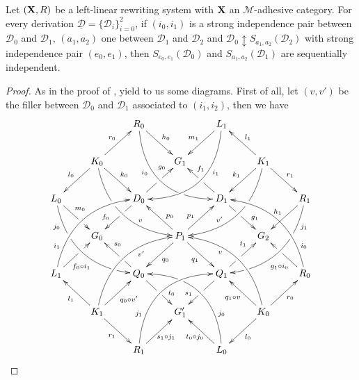 \documentclass[a4paper,UKenglish,cleveref,pdftex,thm-restate,numberwithinsect]{lipics-v2021}
\def\R{\mathsf{R}}
\def\X{\textbf {\textup{X}}}
\newcommand{\dder}[1]{\mathscr{#1}}
\newcommand{\der}[1]{\underline{\dder{#1}}}
\begin{document}

	\begin{lemma}\label{lem:iig2}Let $(\X,\R)$ be a left-linear rewriting system with $\X$ an $\mathcal{M}$-adhesive category. For every derivation $\der{D}=\{\dder{D}_i\}_{i=0}^2$, if $(i_0,i_1)$ is a strong independence pair between $\dder{D}_0$ and $\dder{D}_1$, $(a_1,a_2)$ one between $\dder{D}_1$ and $\dder{D}_2$ and $\dder{D}_0\updownarrow S_{a_1,a_2}(\dder{D}_2)$ with strong independence pair $(e_0,e_1)$, then $S_{e_0,e_1}(\dder{D}_0)$ and $S_{a_1,a_2}(\dder{D}_1)$ are sequentially independent.
	\end{lemma}
	\begin{proof} As in the proof of ,  yield to us some diagrams.  First of all, let $(v,v')$ be the filler between $\dder{D}_0$ and $\dder{D}_1$ associated to $(i_1, i_2)$, then we have
		\[\xymatrix{&&R_0 \ar@/_1cm/[ddrr]_(.35){i_0}|(.7)\hole \ar[dr]^{h_0}&& L_1\ar@/^1cm/[ddll]^(.35){i_1}  \ar[dl]_{m_1}\\&K_0\ar[dr]^{k_0}\ar[dl]_{l_0} \ar@/_.8cm/[ddrr]|(.36)\hole^(.65){v}\ar[ur]^{r_0}&& G_1 && K_1 \ar@/^.8cm/[ddll]|(.36)\hole_(.65){v'}\ar[dl]_{k_1}\ar[lu]_{l_1} \ar[dr]^{r_1}\\L_0 \ar@/_.8cm/[ddrr]_(.2){j_0}|(.31)\hole|(.81)\hole \ar[dr]^(.4){m_0}|(.61)\hole && D_0 \ar[dl]|(.4)\hole_(.65){f_0}\ar[ur]|(.5)\hole^(.7){g_0}&&D_1 \ar[dr]|(.4)\hole^(.65){g_1} \ar[ul]|(.5)\hole_(.65){f_1}&&R_1\ar@/^.8cm/[ddll]^(.2){j_1}|(.31)\hole|(.81)\hole\ar[dl]_{h_1}\\&G_0 &&P_1\ar[dr]_{q_1} \ar[dl]^{q_0}\ar[ur]^(.4){p_1}\ar[ul]_(.4){p_0}&&G_2\\L_1 \ar@/^.8cm/[uurr]^(.2){i_1} \ar[ur]_(.35){f_0\circ i_1}|(.61)\hole&&Q_0 \ar[ul]|(.4)\hole_(.65){s_0}\ar[dr]|(.5)\hole^(.65){t_0} &&Q_1\ar[ur]|(.4)\hole^(.65){t_1} \ar[dl]|(.5)\hole_(.65){s_1} && R_0  \ar[ul]^(.35){g_1\circ i_0}|(.61)\hole\ar@/_.8cm/[uull]_(.2){i_0}\\&K_1 \ar[ur]_{q_0\circ v'} \ar[dr]_{r_1} \ar[ul]^{l_1}\ar@/^.8cm/[uurr]_(.65){v'}&&G'_1&& K_0 \ar[ur]_{r_0} \ar[ul]^{q_1\circ v} \ar[dl]^{l_0} \ar@/_.8cm/[uull]^(.65){v}\\&& R_1 \ar[ur]_{\hspace{-5pt}s_1\circ j_1}\ar@/^1cm/[uurr]^(.25){j_1}&& L_0 \ar[ul]^{t_0\circ j_0\hspace{-5pt}} \ar@/_1cm/[uull]_(.25){j_0} |(.69)\hole }\]


\end{proof}
\end{document}
